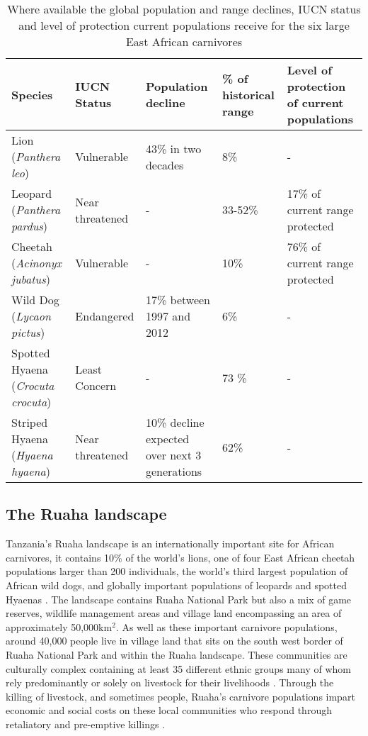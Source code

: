 \begin{table}[h]
	\small
	\begin{center}
		\begin{tabular}{p{2.1cm} p{2.7cm} p{3cm} p{3cm} p{3cm}}
			\hline \hline		
			Species 			& IUCN Status			& Population decline 	& \% of historical range & Level of protection of current populations\\ \hline
			Lion	 (\textit{Panthera leo})				& Vulnerable 		& 43\% in two decades 		& 8\% 		& - \\
			Leopard 	(\textit{Panthera pardus})		& Near threatened 	& -	 						& 33-52\% 	&17\% of current range protected\\
			Cheetah (\textit{Acinonyx jubatus})		& Vulnerable			& - 							& 10\% 		& 76\% of current range protected\\
			Wild Dog (\textit{Lycaon pictus})		& Endangered			& 17\% between 1997 and 2012	& 6\%		& - \\
			Spotted Hyaena (\textit{Crocuta crocuta})& Least Concern		& - 							& 73	\%		& - \\
			Striped Hyaena (\textit{Hyaena hyaena})	& Near threatened	& 10\% decline expected over next 3 generations & 62\% & - \\
			\hline \hline						
		\end{tabular}
		\caption{Where available the global population and range declines, IUCN status and level of protection current populations receive for the six large East African carnivores %
		}
	\label{table:EACarn}
	\end{center}
\end{table}

\subsection{The Ruaha landscape}
 
Tanzania's Ruaha landscape is an internationally important site for African carnivores, it contains 10\% of the world's lions, one of four East African cheetah populations larger than 200 individuals, the world's third largest population of African wild dogs, and globally important populations of leopards and spotted Hyaenas \cite{Dickman2014d}. The landscape contains Ruaha National Park but also a mix of game reserves, wildlife management areas and village land encompassing an area of approximately 50,000km$^2$. As well as these important carnivore populations, around 40,000 people live in village land that sits on the south west border of Ruaha National Park and within the Ruaha landscape. These communities are culturally complex containing at least 35 different ethnic groups many of whom rely predominantly or solely on livestock for their livelihoods  \cite{Abade2014h}. Through the killing of livestock, and sometimes people, Ruaha's carnivore populations impart economic and social costs on these local communities who respond through retaliatory and pre-emptive killings \cite{Dickman2010b}.\\

